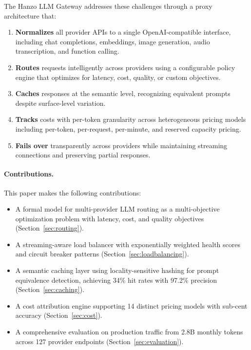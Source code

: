 \documentclass[11pt,twocolumn]{article}
\begin{document}
The Hanzo LLM Gateway addresses these challenges through a proxy architecture that:

\begin{enumerate}[leftmargin=*]
    \item \textbf{Normalizes} all provider APIs to a single OpenAI-compatible interface, including chat completions, embeddings, image generation, audio transcription, and function calling.
    \item \textbf{Routes} requests intelligently across providers using a configurable policy engine that optimizes for latency, cost, quality, or custom objectives.
    \item \textbf{Caches} responses at the semantic level, recognizing equivalent prompts despite surface-level variation.
    \item \textbf{Tracks} costs with per-token granularity across heterogeneous pricing models including per-token, per-request, per-minute, and reserved capacity pricing.
    \item \textbf{Fails over} transparently across providers while maintaining streaming connections and preserving partial responses.
\end{enumerate}

\paragraph{Contributions.} This paper makes the following contributions:
\begin{itemize}[leftmargin=*]
    \item A formal model for multi-provider LLM routing as a multi-objective optimization problem with latency, cost, and quality objectives (Section~\ref{sec:routing}).
    \item A streaming-aware load balancer with exponentially weighted health scores and circuit breaker patterns (Section~\ref{sec:loadbalancing}).
    \item A semantic caching layer using locality-sensitive hashing for prompt equivalence detection, achieving 34\% hit rates with 97.2\% precision (Section~\ref{sec:caching}).
    \item A cost attribution engine supporting 14 distinct pricing models with sub-cent accuracy (Section~\ref{sec:cost}).
    \item A comprehensive evaluation on production traffic from 2.8B monthly tokens across 127 provider endpoints (Section~\ref{sec:evaluation}).
\end{itemize}
\end{document}
